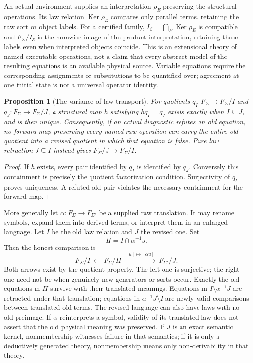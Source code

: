 \documentclass[11pt]{article}
\newtheorem{proposition}[theorem]{Proposition}
\theoremstyle{definition}
\theoremstyle{remark}\newtheorem{remark}[theorem]{Remark}
\newcommand{\Ker}{\operatorname{Ker}}
\begin{document}
An actual environment supplies an interpretation $\rho_E$ preserving the
structural operations. Its law relation $\Ker\rho_E$ compares only parallel
terms, retaining the raw sort or object labels. For a certified
family, $I_{\mathcal E}=\bigcap_E\Ker\rho_E$ is compatible and
$F_\Sigma/I_{\mathcal E}$ is the homwise image of the product
interpretation, retaining those labels even when interpreted objects coincide.
This is an extensional theory of named executable operations, not a claim
that every abstract model of the resulting equations is an available
physical source. Variable equations require the corresponding assignments
or substitutions to be quantified over; agreement at one initial state is
not a universal operator identity.

\begin{proposition}[The variance of law transport]\label{prop:variance}
For quotients $q_I:F_\Sigma\to F_\Sigma/I$ and
$q_J:F_\Sigma\to F_\Sigma/J$, a structural map $h$ satisfying
$h q_I=q_J$ exists exactly when $I\subseteq J$, and is then unique.
Consequently, if an actual diagnostic refutes an old equation, no forward
map preserving every named raw operation can carry the entire old quotient
into a revised quotient in which that equation is false. Pure law
retraction $J\subseteq I$ instead gives $F_\Sigma/J\to F_\Sigma/I$.
\end{proposition}
\begin{proof}
If $h$ exists, every pair identified by $q_I$ is identified by $q_J$.
Conversely this containment is precisely the quotient factorization
condition. Surjectivity of $q_I$ proves uniqueness. A refuted old pair
violates the necessary containment for the forward map.
\end{proof}

More generally let $\alpha:F_\Sigma\to F_{\Sigma'}$ be a supplied raw
translation. It may rename symbols, expand them into derived terms, or
interpret them in an enlarged language. Let $I$ be the old law relation
and $J$ the revised one. Set
\[
 H=I\cap\alpha^{-1}J.
\]
Then the honest comparison is
\begin{equation}\label{eq:common-span}
 F_\Sigma/I\ \longleftarrow\ F_\Sigma/H
       \ \xrightarrow{\ [u]\mapsto[\alpha u]\ }\ F_{\Sigma'}/J.
\end{equation}
Both arrows exist by the quotient property. The left one is surjective;
the right one need not be when genuinely new generators or sorts occur.
Exactly the old equations in $H$ survive with their translated meanings.
Equations in $I\setminus\alpha^{-1}J$ are retracted under that translation;
equations in $\alpha^{-1}J\setminus I$ are newly valid comparisons between
translated old terms. The revised language can also have laws with no old
preimage. If $\alpha$ reinterprets a symbol, validity of its translated law
does not assert that the old physical meaning was preserved. If $J$ is an
exact semantic kernel, nonmembership witnesses failure in that semantics;
if it is only a deductively generated theory, nonmembership means only
non-derivability in that theory.
\end{document}

